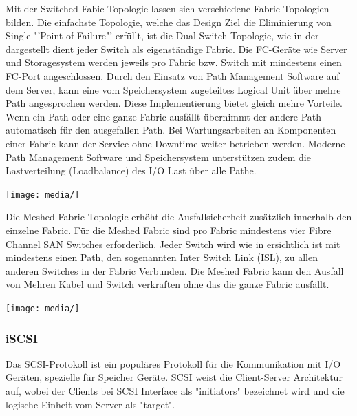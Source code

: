 Mit der Switched-Fabic-Topologie lassen sich verschiedene Fabric Topologien bilden.
Die einfachste Topologie, welche das Design Ziel die Eliminierung von Single "'Point of Failure"' erfüllt, ist die Dual Switch Topologie, wie in der  dargestellt dient jeder Switch als eigenständige Fabric. Die FC-Geräte wie Server und Storagesystem werden jeweils pro Fabric bzw. Switch mit mindestens einen FC-Port angeschlossen. Durch den Einsatz von Path Management Software auf dem Server, kann eine vom Speichersystem zugeteiltes Logical Unit über mehre Path angesprochen werden. Diese Implementierung bietet gleich mehre Vorteile. Wenn ein Path oder eine ganze Fabric ausfällt übernimmt der andere Path automatisch für den ausgefallen Path. Bei Wartungsarbeiten an Komponenten einer Fabric kann der Service ohne Downtime weiter betrieben werden. Moderne Path Management Software und Speichersystem unterstützen zudem die Lastverteilung (Loadbalance) des I/O Last über alle Pathe.\cite{Christopher2009}

\begin{center}
\texttt{[image: media/]}
\end{center}

Die Meshed Fabric Topologie erhöht die Ausfallsicherheit zusätzlich innerhalb den einzelne Fabric. Für die Meshed Fabric sind pro Fabric mindestens vier Fibre Channel SAN Switches erforderlich. Jeder Switch wird wie in  ersichtlich ist mit mindestens einen Path, den sogenannten Inter Switch Link (ISL), zu allen anderen Switches in der Fabric Verbunden. Die Meshed Fabric kann den Ausfall von Mehren Kabel und Switch verkraften ohne das die ganze Fabric ausfällt.\cite{Christopher2009}

\begin{center}
\texttt{[image: media/]}
\end{center}

\subsubsection{iSCSI}
Das SCSI-Protokoll ist ein populäres Protokoll für die Kommunikation mit I/O Geräten, spezielle für Speicher Geräte. SCSI weist die Client-Server Architektur auf, wobei der Clients bei SCSI Interface als "initiators" bezeichnet wird und die logische Einheit vom Server als "target".

